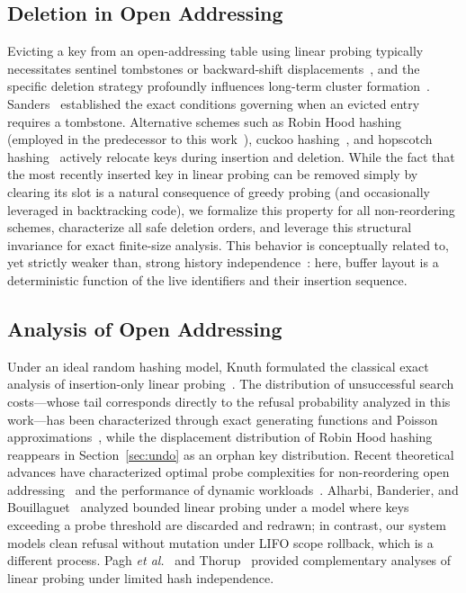 \subsection{Deletion in Open Addressing}
Evicting a key from an open-addressing table using linear probing typically necessitates sentinel tombstones or backward-shift displacements~\cite{knuth3,jimenez2018}, and the specific deletion strategy profoundly influences long-term cluster formation~\cite{bender2021}. Sanders~\cite{sanders2018} established the exact conditions governing when an evicted entry requires a tombstone. Alternative schemes such as Robin Hood hashing~\cite{celis1985} (employed in the predecessor to this work~\cite{metis}), cuckoo hashing~\cite{pagh2004}, and hopscotch hashing~\cite{herlihy2008} actively relocate keys during insertion and deletion. While the fact that the most recently inserted key in linear probing can be removed simply by clearing its slot is a natural consequence of greedy probing (and occasionally leveraged in backtracking code), we formalize this property for all non-reordering schemes, characterize all safe deletion orders, and leverage this structural invariance for exact finite-size analysis. This behavior is conceptually related to, yet strictly weaker than, strong history independence~\cite{naor2001,blelloch2007}: here, buffer layout is a deterministic function of the live identifiers and their insertion sequence.

\subsection{Analysis of Open Addressing}
Under an ideal random hashing model, Knuth formulated the classical exact analysis of insertion-only linear probing~\cite{knuth3}. The distribution of unsuccessful search costs—whose tail corresponds directly to the refusal probability analyzed in this work—has been characterized through exact generating functions and Poisson approximations~\cite{fpv1998,janson2001,janson2016}, while the displacement distribution of Robin Hood hashing~\cite{janson2005,viola2005} reappears in Section~\ref{sec:undo} as an orphan key distribution. Recent theoretical advances have characterized optimal probe complexities for non-reordering open addressing~\cite{fkk2024} and the performance of dynamic workloads~\cite{tinypointers2025}. Alharbi, Banderier, and Bouillaguet~\cite{abb2026} analyzed bounded linear probing under a model where keys exceeding a probe threshold are discarded and redrawn; in contrast, our system models clean refusal without mutation under LIFO scope rollback, which is a different process. Pagh \emph{et al.}~\cite{pagh2007} and Thorup~\cite{thorup2015} provided complementary analyses of linear probing under limited hash independence.

